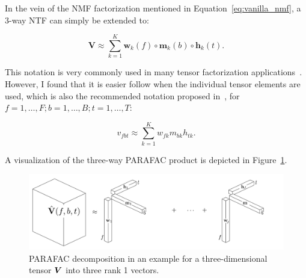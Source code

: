 In the vein of the NMF factorization mentioned in Equation~\ref{eq:vanilla_nmf}, a 3-way NTF can simply be extended to:

\begin{equation}
   \mathbf{V} \approx \sum\limits_{k=1}^{K} \mathbf{w}_{k}(f) \circ \mathbf{m}_{k}(b) \circ \mathbf{h}_{k}(t).
\end{equation}

This notation is very commonly used in many tensor factorization applications~\cite{kolda09}.
However, I found that it is easier follow when the individual tensor elements are used, which is also the recommended notation proposed in~\cite{kiers00}, for  $f = 1,\ldots,F; b=1,\ldots,B;t=1,\ldots,T$:

\begin{equation}
  v_{fbt} \approx \sum_{k = 1}^{K} w_{fk} m_{bk} h_{tk}.
\end{equation}

A visualization of the three-way PARAFAC product is depicted in Figure~\ref{fig:cpd}.

\begin{figure}[!t]
  \centering
  \includegraphics[width=1\textwidth]{Chapters/06_Separation_Unknown/figures/cpd.pdf}
  \caption{PARAFAC decomposition in an example for a three-dimensional tensor \({\bm{V}}\) into three rank 1 vectors.}
  \label{fig:cpd}
\end{figure}

